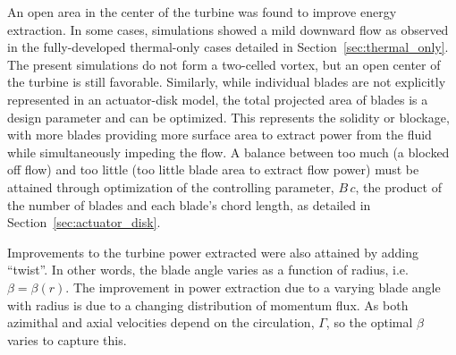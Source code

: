 An open area in the center of the turbine was found to improve energy
extraction. In some cases, simulations showed a mild downward flow as
observed in the fully-developed thermal-only cases detailed in
Section~\ref{sec:thermal_only}. The present simulations do not form a
two-celled vortex, but an open center of the turbine is still
favorable. Similarly, while individual blades are not explicitly
represented in an actuator-disk model, the total projected area of
blades is a design parameter and can be optimized. This represents the
solidity or blockage, with more blades providing more surface area to extract
power from the fluid while simultaneously impeding the flow. A balance
between too much (a blocked off flow) and too little (too little blade
area to extract flow power) must be attained through optimization of the
controlling parameter, $B \, c$, the product of the number of blades and
each blade's chord length, as detailed in
Section~\ref{sec:actuator_disk}. 

Improvements to the turbine power extracted were also attained by adding
``twist''. In other words, the blade angle varies as a function of
radius, i.e. $\beta = \beta(r)$. The improvement in power extraction due
to a varying blade angle with radius is due to a changing distribution
of momentum flux. As both azimithal and axial velocities depend on the
circulation, $\Gamma$, so the optimal $\beta$ varies to capture
this.  

